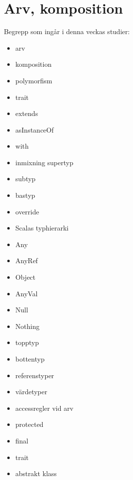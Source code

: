 \chapter{Arv, komposition}\label{chapter:W10}
Begrepp som ingår i denna veckas studier:
\begin{itemize}[noitemsep,label={$\square$},leftmargin=*]
\item arv
\item komposition
\item polymorfism
\item trait
\item extends
\item asInstanceOf
\item with
\item inmixning supertyp
\item subtyp
\item bastyp
\item override
\item Scalas typhierarki
\item Any
\item AnyRef
\item Object
\item AnyVal
\item Null
\item Nothing
\item topptyp
\item bottentyp
\item referenstyper
\item värdetyper
\item accessregler vid arv
\item protected
\item final
\item trait
\item abstrakt klass\end{itemize}

